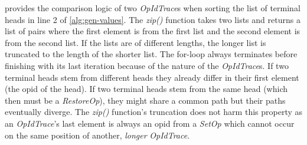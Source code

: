 \documentclass[sigplan,10pt]{acmart}
\newcommand{\setopkind}{\textit{SetOp}}
\newcommand{\restopkind}{\textit{RestoreOp}}
\newcommand{\opidtrace}{\textit{OpIdTrace}}
\begin{document}
 provides the comparison logic of two \opidtrace{}s
when sorting the list of terminal heads in line 2 of \cref{alg:gen-values}.
The \textit{zip()} function takes two lists and returns a list of pairs
where the first element is from the first list and the second element
is from the second list.
If the lists are of different lengths, the longer list is truncated to the
length of the shorter list.
The for-loop always terminates before finishing with
its last iteration because of the nature of the \opidtrace{}s.
If two terminal heads stem from different heads they already differ in their
first element (the \gls*{opid} of the head).
If two terminal heads stem from the same head (which then must be a \restopkind{}),
they might share a common path but their paths eventually diverge.
The \textit{zip()} function's truncation does not harm this property
as an \opidtrace{}'s last element is always an \gls*{opid} from a \setopkind{}
which cannot occur on the same position of another, \emph{longer} \opidtrace{}.
\end{document}

